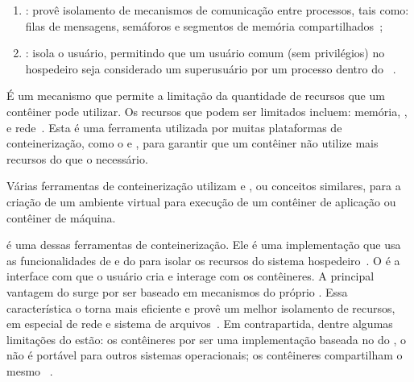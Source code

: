 \begin{description}
\begin{enumerate}[label=(\roman*)]
        \item \ipc: provê isolamento de mecanismos de comunicação entre processos, tais como: filas de mensagens, semáforos e segmentos de memória compartilhados~\cite{watada2019emerging, dua2014virtualization};
        \item \user: isola o usuário, permitindo que um usuário comum (sem privilégios) no hospedeiro seja considerado um superusuário por um processo dentro do \namespace~\cite{watada2019emerging}.
    \end{enumerate}
    \item[\cgroups.] É um mecanismo que permite a limitação da quantidade de recursos que um contêiner pode utilizar. Os recursos que podem ser limitados incluem: memória, \cpu, \io e rede~\cite{watada2019emerging}. Esta é uma ferramenta utilizada por muitas plataformas de conteinerização, como o \docker e \lxc, para garantir que um contêiner não utilize mais recursos do que o necessário.
\end{description}

Várias ferramentas de conteinerização utilizam \namespaces e \cgroups, ou conceitos similares, para a criação de um ambiente virtual para execução de um contêiner de aplicação ou contêiner de máquina.

\lxc é uma dessas ferramentas de conteinerização. Ele é uma implementação que usa as funcionalidades de \namespaces e \cgroups do \linux para isolar os recursos do sistema hospedeiro~\cite{watada2019emerging}. O \lxd é a interface com que o usuário cria e interage com os contêineres. A principal vantagem do \lxc surge por ser baseado em mecanismos do próprio . Essa característica o torna mais eficiente e provê um melhor isolamento de recursos, em especial de rede e sistema de arquivos~\cite{dua2014virtualization}. Em contrapartida, dentre algumas limitações do \lxc estão: os contêineres por ser uma implementação baseada no  do \linux, o \lxc não é portável para outros sistemas operacionais; os contêineres compartilham o mesmo ~\cite{dua2014virtualization}.

